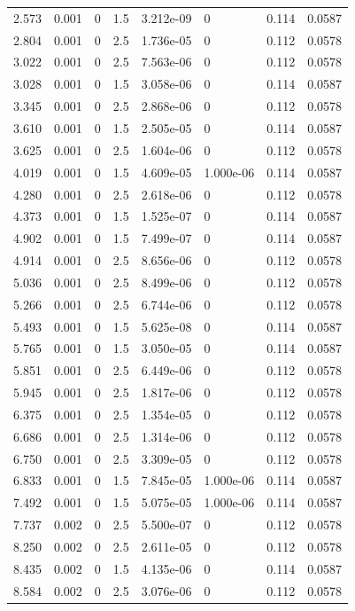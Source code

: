 \documentclass[preview]{standalone}
\begin{document}
{{\begin{tabular}{L{1.2cm}C{1.2cm} C{0.3cm}C{0.5cm} C{1.4cm}C{1.4cm} C{1.4cm}C{1.4cm}}
  2.573  &  0.001  & 0     & 1.5 &  3.212e-09  & 0  & 0.114 &  0.0587   \\ 
  2.804  &  0.001  & 0     & 2.5 &  1.736e-05  & 0  & 0.112 &  0.0578   \\ 
  3.022  &  0.001  & 0     & 2.5 &  7.563e-06  & 0  & 0.112 &  0.0578   \\ 
  3.028  &  0.001  & 0     & 1.5 &  3.058e-06  & 0  & 0.114 &  0.0587   \\ 
  3.345  &  0.001  & 0     & 2.5 &  2.868e-06  & 0  & 0.112 &  0.0578   \\ 
  3.610  &  0.001  & 0     & 1.5 &  2.505e-05  & 0  & 0.114 &  0.0587   \\ 
  3.625  &  0.001  & 0     & 2.5 &  1.604e-06  & 0  & 0.112 &  0.0578   \\ 
  4.019  &  0.001  & 0     & 1.5 &  4.609e-05  & 1.000e-06  & 0.114 &  0.0587   \\ 
  4.280  &  0.001  & 0     & 2.5 &  2.618e-06  & 0  & 0.112 &  0.0578   \\ 
  4.373  &  0.001  & 0     & 1.5 &  1.525e-07  & 0  & 0.114 &  0.0587   \\ 
  4.902  &  0.001  & 0     & 1.5 &  7.499e-07  & 0  & 0.114 &  0.0587   \\ 
  4.914  &  0.001  & 0     & 2.5 &  8.656e-06  & 0  & 0.112 &  0.0578   \\ 
  5.036  &  0.001  & 0     & 2.5 &  8.499e-06  & 0  & 0.112 &  0.0578   \\ 
  5.266  &  0.001  & 0     & 2.5 &  6.744e-06  & 0  & 0.112 &  0.0578   \\ 
  5.493  &  0.001  & 0     & 1.5 &  5.625e-08  & 0  & 0.114 &  0.0587   \\ 
  5.765  &  0.001  & 0     & 1.5 &  3.050e-05  & 0  & 0.114 &  0.0587   \\ 
  5.851  &  0.001  & 0     & 2.5 &  6.449e-06  & 0  & 0.112 &  0.0578   \\ 
  5.945  &  0.001  & 0     & 2.5 &  1.817e-06  & 0  & 0.112 &  0.0578   \\ 
  6.375  &  0.001  & 0     & 2.5 &  1.354e-05  & 0  & 0.112 &  0.0578   \\ 
  6.686  &  0.001  & 0     & 2.5 &  1.314e-06  & 0  & 0.112 &  0.0578   \\ 
  6.750  &  0.001  & 0     & 2.5 &  3.309e-05  & 0  & 0.112 &  0.0578   \\ 
  6.833  &  0.001  & 0     & 1.5 &  7.845e-05  & 1.000e-06  & 0.114 &  0.0587   \\ 
  7.492  &  0.001  & 0     & 1.5 &  5.075e-05  & 1.000e-06  & 0.114 &  0.0587   \\ 
  7.737  &  0.002  & 0     & 2.5 &  5.500e-07  & 0  & 0.112 &  0.0578   \\ 
  8.250  &  0.002  & 0     & 2.5 &  2.611e-05  & 0  & 0.112 &  0.0578   \\ 
  8.435  &  0.002  & 0     & 1.5 &  4.135e-06  & 0  & 0.114 &  0.0587   \\ 
  8.584  &  0.002  & 0     & 2.5 &  3.076e-06  & 0  & 0.112 &  0.0578   \\ 
\hline 
\end{tabular} 

}}
\end{document}
